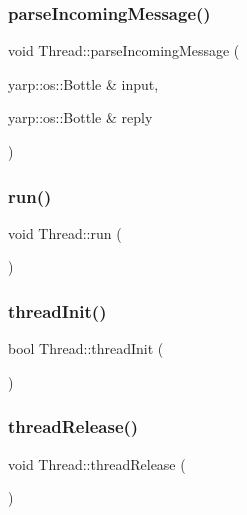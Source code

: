 \subsubsection{\texorpdfstring{parse\+Incoming\+Message()}{parseIncomingMessage()}}
{\footnotesize\ttfamily void Thread\+::parse\+Incoming\+Message (\begin{DoxyParamCaption}\item[{yarp\+::os\+::\+Bottle \&}]{input,  }\item[{yarp\+::os\+::\+Bottle \&}]{reply }\end{DoxyParamCaption})\hspace{0.3cm}{\ttfamily [private]}}

\hypertarget{classThread_ad9373d8d725c46717dfce3130018fe3a}{}\label{classThread_ad9373d8d725c46717dfce3130018fe3a} 
\subsubsection{\texorpdfstring{run()}{run()}}
{\footnotesize\ttfamily void Thread\+::run (\begin{DoxyParamCaption}{ }\end{DoxyParamCaption})}

\hypertarget{classThread_a1e840470cd71d7bfb2430d24169e3dce}{}\label{classThread_a1e840470cd71d7bfb2430d24169e3dce} 
\subsubsection{\texorpdfstring{thread\+Init()}{threadInit()}}
{\footnotesize\ttfamily bool Thread\+::thread\+Init (\begin{DoxyParamCaption}{ }\end{DoxyParamCaption})}

\hypertarget{classThread_aa2856c7d45670f45d66bcb319255defe}{}\label{classThread_aa2856c7d45670f45d66bcb319255defe} 
\subsubsection{\texorpdfstring{thread\+Release()}{threadRelease()}}
{\footnotesize\ttfamily void Thread\+::thread\+Release (\begin{DoxyParamCaption}{ }\end{DoxyParamCaption})}

